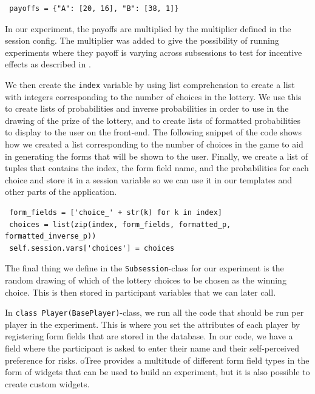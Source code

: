 \documentclass [12pt,a4paper,oneside]{article}
\begin{document}
\begin{verbatim}
 payoffs = {"A": [20, 16], "B": [38, 1]}
\end{verbatim}

In our experiment, the payoffs are multiplied by the multiplier defined in the session config. The multiplier was added to give the possibility of running experiments where they payoff is varying across subsessions to test for incentive effects as described in \cite{holt_risk_2002}. 

We then create the \texttt{index} variable by using list comprehension to create a list with integers corresponding to the number of choices in the lottery. We use this to create lists of probabilities and inverse probabilities in order to use in the drawing of the prize of the lottery, and to create lists of formatted probabilities to display to the user on the front-end. The following snippet of the code shows how we created a list corresponding to the number of choices in the game to aid in generating the forms that will be shown to the user. Finally, we create a list of tuples that contains the index, the form field name, and the probabilities for each choice and store it in a session variable so we can use it in our templates and other parts of the application.

\begin{verbatim}
 form_fields = ['choice_' + str(k) for k in index]
 choices = list(zip(index, form_fields, formatted_p, formatted_inverse_p))
 self.session.vars['choices'] = choices
\end{verbatim}

The final thing we define in the \texttt{Subsession}-class for our experiment is the random drawing of which of the lottery choices to be chosen as the winning choice. This is then stored in participant variables that we can later call.

In \texttt{class Player(BasePlayer)}-class, we run all the code that should be run per player in the experiment. This is where you set the attributes of each player by registering form fields that are stored in the database. In our code, we have a field where the participant is asked to enter their name and their self-perceived preference for risks. oTree provides a multitude of different form field types in the form of widgets that can be used to build an experiment, but it is also possible to create custom widgets. 
\end{document}
